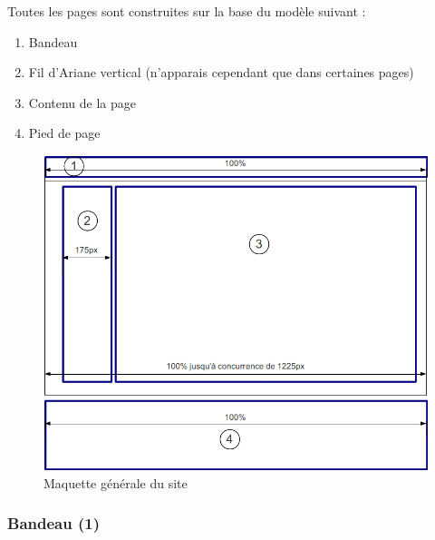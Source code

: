 \documentclass[letter, 11pt]{report}
\begin{document}
Toutes les pages sont construites sur la base du modèle suivant :

\begin{enumerate}
	\item Bandeau
	\item Fil d'Ariane vertical (n'apparais cependant que dans certaines pages)
	\item Contenu de la page
	\item Pied de page
\end{enumerate}

\begin{figure}[h!tbp]
	\begin{center}
		\includegraphics[scale=0.59]{maquetteImage.png}
	\end{center}
	\caption{Maquette générale du site}
\end{figure}

\subsubsection{Bandeau (1)}
\end{document}
